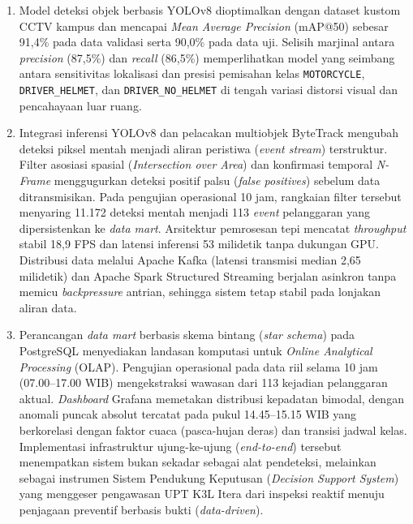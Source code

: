 \begin{enumerate}[1.]
  \item  Model deteksi objek berbasis YOLOv8 dioptimalkan dengan dataset kustom CCTV kampus dan mencapai \textit{Mean Average Precision} (mAP@50) sebesar 91,4\% pada data validasi serta 90,0\% pada data uji. Selisih marjinal antara \textit{precision} (87,5\%) dan \textit{recall} (86,5\%) memperlihatkan model yang seimbang antara sensitivitas lokalisasi dan presisi pemisahan kelas \texttt{MOTORCYCLE}, \texttt{DRIVER\_HELMET}, dan \texttt{DRIVER\_NO\_HELMET} di tengah variasi distorsi visual dan pencahayaan luar ruang.

  \item Integrasi inferensi YOLOv8 dan pelacakan multiobjek ByteTrack mengubah deteksi piksel mentah menjadi aliran peristiwa (\textit{event stream}) terstruktur. Filter asosiasi spasial (\textit{Intersection over Area}) dan konfirmasi temporal \textit{N-Frame} menggugurkan deteksi positif palsu (\textit{false positives}) sebelum data ditransmisikan. Pada pengujian operasional 10 jam, rangkaian filter tersebut menyaring 11.172 deteksi mentah menjadi 113 \textit{event} pelanggaran yang dipersistenkan ke \textit{data mart}. Arsitektur pemrosesan tepi mencatat \textit{throughput} stabil 18,9 FPS dan latensi inferensi 53 milidetik tanpa dukungan GPU. Distribusi data melalui Apache Kafka (latensi transmisi median 2,65 milidetik) dan Apache Spark Structured Streaming berjalan asinkron tanpa memicu \textit{backpressure} antrian, sehingga sistem tetap stabil pada lonjakan aliran data.

  \item Perancangan \textit{data mart} berbasis skema bintang (\textit{star schema}) pada PostgreSQL menyediakan landasan komputasi untuk \textit{Online Analytical Processing} (OLAP). Pengujian operasional pada data riil selama 10 jam (07.00--17.00 WIB) mengekstraksi wawasan dari 113 kejadian pelanggaran aktual. \textit{Dashboard} Grafana memetakan distribusi kepadatan bimodal, dengan anomali puncak absolut tercatat pada pukul 14.45--15.15 WIB yang berkorelasi dengan faktor cuaca (pasca-hujan deras) dan transisi jadwal kelas. Implementasi infrastruktur ujung-ke-ujung (\textit{end-to-end}) tersebut menempatkan sistem bukan sekadar sebagai alat pendeteksi, melainkan sebagai instrumen Sistem Pendukung Keputusan (\textit{Decision Support System}) yang menggeser pengawasan UPT K3L Itera dari inspeksi reaktif menuju penjagaan preventif berbasis bukti (\textit{data-driven}).
\end{enumerate}

